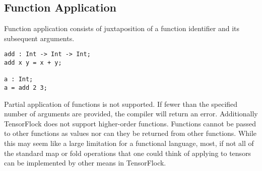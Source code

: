 \subsection{Function Application}
Function application consists of juxtaposition of a function identifier and its 
subsequent arguments.
\begin{lstlisting}
add : Int -> Int -> Int;
add x y = x + y;

a : Int;
a = add 2 3;
\end{lstlisting}

Partial application of functions is not supported. If fewer than the specified number of 
arguments are provided, the compiler will return an error. Additionally TensorFlock 
does not support higher-order functions. Functions cannot be passed to
other functions as values nor can they be returned from other functions. While
this may seem like a large limitation for a functional language, most, if not
all of the standard map or fold operations that one could think of applying to
tensors can be implemented by other means in TensorFlock.
